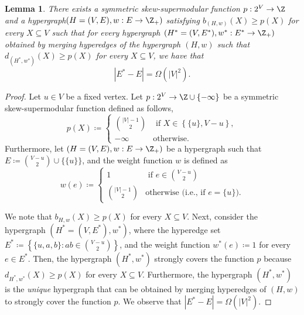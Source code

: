 \documentclass{article}
\newtheorem{lemma}{Lemma}[section]
\begin{document}
\begin{lemma}
There exists a symmetric skew-supermodular function  $p:2^V\rightarrow\Z$ and a hypergraph\linebreak $\left(H = (V, E), w:E \rightarrow\Z_+\right)$ satisfying $b_{(H, w)}(X) \geq p(X)$ for every $X \subseteq V$ such that for every hypergraph $\left(H^* = (V, E^*), w^*:E^* \rightarrow\Z_+\right)$ obtained by merging hyperedges of the hypergraph $(H, w)$ such that $d_{(H^*, w^*)}(X) \geq p(X)$ for every $X\subseteq V$, we have that 
\[
|E^*-E|=\Omega(|V|^2). 
\]
\end{lemma}
\begin{proof}
Let $u\in V$ be a fixed vertex. Let $p:2^V\rightarrow\Z\cup\{-\infty\}$ be a symmetric skew-supermodular function defined as follows,
$$p(X) \coloneqq  \begin{cases}
    {\binom{|V| - 1}{2}}& \text{ if } X \in \left\{\{u\}, V - u\right\},\\
    - \infty &\text{otherwise.}
\end{cases}$$
Furthermore, let $(H = (V, E), w:E\rightarrow\Z_+)$ be a hypergraph such that $E \coloneqq  {\binom{V - u}{2}}\cup \{\{u\}\}$, and the weight function $w$ is defined as
$$w(e) \coloneqq  \begin{cases}
    1& \text{ if } e \in {\binom{V - u}{2}}\\
    {\binom{|V| - 1}{2}}& \text{otherwise (i.e., if $e = \{u\}$)}.
\end{cases}$$

We note that $b_{H, w}(X) \geq p(X)$ for every $X \subseteq V$. Next, consider the hypergraph $(H^* = (V, E^*), w^*)$, where the hyperedge set $E^* \coloneqq  \left\{\{u, a, b\} : ab \in {\binom{V-u}{2}}\right\}$, and the weight function $w^*(e) \coloneqq  1$ for every $e \in E^*$. Then, the hypergraph $(H^*, w^*)$ strongly covers the function $p$ because $d_{H^*, w^*}(X) \geq p(X)$ for every $X \subseteq V$. Furthermore, the hypergraph $(H^*, w^*)$ is the \emph{unique} hypergraph that can be obtained by merging hyperedges of $(H, w)$ to strongly cover the function $p$. We observe that $|E^*-E| = \Omega(|V|^2)$. 
\end{proof}
\end{document}
